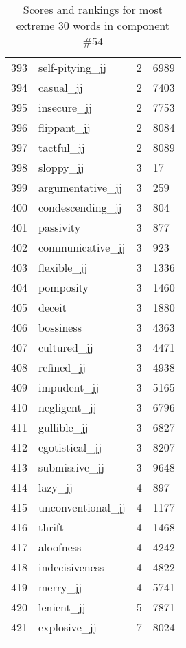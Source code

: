 \begin{longtable}[!htbp]{| rlr@{.}l |}
    393 & self-pitying\_jj & 2 & 6989 \\
    394 & casual\_jj & 2 & 7403 \\
    395 & insecure\_jj & 2 & 7753 \\
    396 & flippant\_jj & 2 & 8084 \\
    397 & tactful\_jj & 2 & 8089 \\
    398 & sloppy\_jj & 3 & 17 \\
    399 & argumentative\_jj & 3 & 259 \\
    400 & condescending\_jj & 3 & 804 \\
    401 & passivity & 3 & 877 \\
    402 & communicative\_jj & 3 & 923 \\
    403 & flexible\_jj & 3 & 1336 \\
    404 & pomposity & 3 & 1460 \\
    405 & deceit & 3 & 1880 \\
    406 & bossiness & 3 & 4363 \\
    407 & cultured\_jj & 3 & 4471 \\
    408 & refined\_jj & 3 & 4938 \\
    409 & impudent\_jj & 3 & 5165 \\
    410 & negligent\_jj & 3 & 6796 \\
    411 & gullible\_jj & 3 & 6827 \\
    412 & egotistical\_jj & 3 & 8207 \\
    413 & submissive\_jj & 3 & 9648 \\
    414 & lazy\_jj & 4 & 897 \\
    415 & unconventional\_jj & 4 & 1177 \\
    416 & thrift & 4 & 1468 \\
    417 & aloofness & 4 & 4242 \\
    418 & indecisiveness & 4 & 4822 \\
    419 & merry\_jj & 4 & 5741 \\
    420 & lenient\_jj & 5 & 7871 \\
    421 & explosive\_jj & 7 & 8024 \\
    \hline
    \caption{Scores and rankings for most extreme 30 words in component \#54} \\
\end{longtable}
